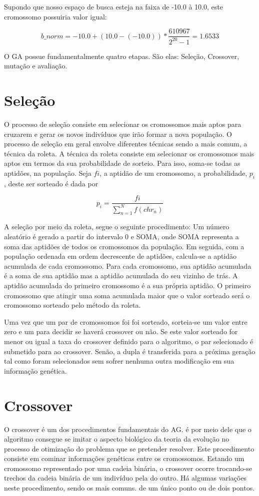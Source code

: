 \documentclass[
    12pt,               %
    twoside,            %
    a4paper,            %
    english,            %
    french,             %
    spanish,            %
    brazil,             %
    ]{abntex2}
\begin{document}
  Supondo que nosso espaço de busca esteja na faixa de -10.0 à 10.0, este cromossomo possuiria valor igual:

  $$b\_norm = -10.0 + (10.0 - (-10.0))* \frac{610967}{2^{20}-1} = 1.6533 $$


  O GA possue fundamentalmente quatro etapas. São elas: Seleção, Crossover, mutação e avaliação.

\section{Seleção}
  O processo de seleção consiste em selecionar os cromossomos mais aptos para cruzarem e gerar os novos indivíduos que irão formar a nova população. O processo de seleção em geral envolve diferentes técnicas sendo a mais comum, a técnica da roleta.  A técnica da roleta consiste em selecionar os cromossomos mais aptos em termos da sua probabilidade de sorteio. Para isso, soma-se todas as aptidões, na população. Seja $fi$, a aptidão de um cromossomo, a probabilidade, 
  $p_i$, deste ser sorteado é dada por 

  $$p_i = \frac{fi}{\sum\limits_{n=1}^N f(chr_n)}$$


  A seleção por meio da roleta, segue o seguinte procedimento: Um número aleatório é gerado a partir do intervalo 0 e SOMA, onde SOMA representa a soma das aptidões de todos os cromossomos da população. Em seguida, com a população ordenada em ordem decrescente de aptidões, calcula-se a aptidão acumulada de cada cromossomo. Para cada cromossomo, sua aptidão acumulada é a soma de sua aptidão mas a aptidão acumulada do seu vizinho de trás. A aptidão acumulada do  primeiro cromossomo é a sua própria aptidão. O primeiro cromossomo que atingir uma soma acumulada maior que o valor sorteado será o cromossomo sorteado pelo método da roleta. 

  Uma vez que um par de cromossomos foi foi sorteado, sorteia-se um valor entre zero e um para decidir se haverá crossover ou não. Se este valor sorteado for menor ou igual a taxa do crossover definido para o algoritmo, o par selecionado é submetido para ao crossover. Senão, a dupla é transferida para a próxima geração tal como foram selecionados sem sofrer nenhuma outra modificação em sua informação genética.

\section{Crossover}
  
  O crossover é um dos procedimentos fundamentais do AG. é por meio dele que o algoritmo consegue se imitar o aspecto biológico da teoria da evolução no processo de otimização do problema que se pretender resolver. Este procedimento consiste em cominar informações genéticas entre os cromossomos. Estando um cromossomo representado por uma cadeia binária, o crossover ocorre trocando-se trechos da cadeia binária de um indivíduo pela do outro. Há algumas variações neste procedimento, sendo os mais comuns. de um único ponto ou de dois pontos.
\end{document}
